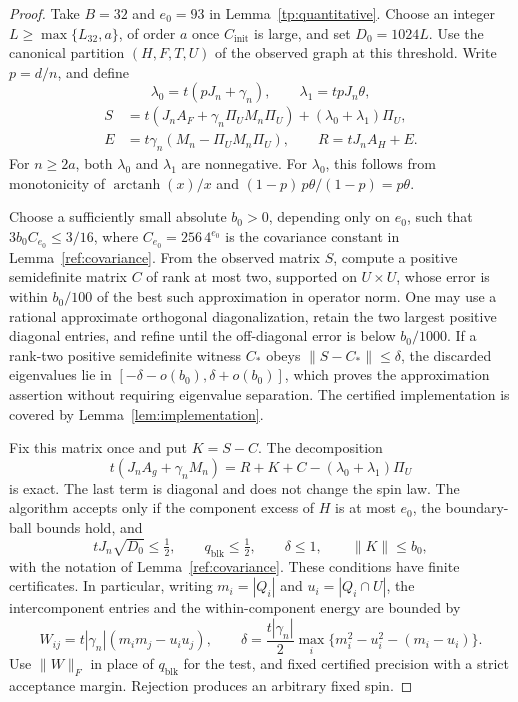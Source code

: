 \documentclass[11pt]{article}
\numberwithin{equation}{section}
\begin{document}
\begin{proof}
Take $B=32$ and $e_0=93$ in Lemma~\ref{tp:quantitative}. Choose an integer $L\ge\max\{L_{32},a\}$, of order $a$ once $C_{\mathrm{init}}$ is large, and set $D_0=1024L$. Use the canonical partition $(H,F,T,U)$ of the observed graph at this threshold. Write $p=d/n$, and define
\[
 \lambda_0=t(pJ_n+\gamma_n),\qquad\lambda_1=tpJ_n\theta,
\]
\[
 \begin{split}
 S&=t(J_nA_F+\gamma_n\Pi_UM_n\Pi_U)+(\lambda_0+\lambda_1)\Pi_U,\\
 E&=t\gamma_n(M_n-\Pi_UM_n\Pi_U),\qquad R=tJ_nA_H+E.
 \end{split}
\]
For $n\ge2a$, both $\lambda_0$ and $\lambda_1$ are nonnegative. For $\lambda_0$, this follows from monotonicity of $\operatorname{arctanh}(x)/x$ and $(1-p)\,p\theta/(1-p)=p\theta$.

Choose a sufficiently small absolute $b_0>0$, depending only on $e_0$, such that $3b_0C_{e_0}\le3/16$, where $C_{e_0}=256\,4^{e_0}$ is the covariance constant in Lemma~\ref{ref:covariance}. From the observed matrix $S$, compute a positive semidefinite matrix $C$ of rank at most two, supported on $U\times U$, whose error is within $b_0/100$ of the best such approximation in operator norm. One may use a rational approximate orthogonal diagonalization, retain the two largest positive diagonal entries, and refine until the off-diagonal error is below $b_0/1000$. If a rank-two positive semidefinite witness $C_*$ obeys $\|S-C_*\|\le\delta$, the discarded eigenvalues lie in $[-\delta-o(b_0),\delta+o(b_0)]$, which proves the approximation assertion without requiring eigenvalue separation. The certified implementation is covered by Lemma~\ref{lem:implementation}.

Fix this matrix once and put $K=S-C$. The decomposition
\begin{equation}\label{tp:initial-decomposition}
 t(J_nA_g+\gamma_nM_n)=R+K+C-(\lambda_0+\lambda_1)\Pi_U
\end{equation}
is exact. The last term is diagonal and does not change the spin law. The algorithm accepts only if the component excess of $H$ is at most $e_0$, the boundary-ball bounds hold, and
\begin{equation}\label{tp:initial-certificate}
 tJ_n\sqrt{D_0}\le\tfrac12,\qquad q_{\mathrm{blk}}\le\tfrac12,
 \qquad\delta\le1,\qquad\|K\|\le b_0,
\end{equation}
with the notation of Lemma~\ref{ref:covariance}. These conditions have finite certificates. In particular, writing $m_i=|Q_i|$ and $u_i=|Q_i\cap U|$, the intercomponent entries and the within-component energy are bounded by
\[
 W_{ij}=t|\gamma_n|(m_im_j-u_iu_j),\qquad
 \delta=\frac{t|\gamma_n|}{2}\max_i\{m_i^2-u_i^2-(m_i-u_i)\}.
\]
Use $\|W\|_F$ in place of $q_{\mathrm{blk}}$ for the test, and fixed certified precision with a strict acceptance margin. Rejection produces an arbitrary fixed spin.


\end{proof}
\end{document}
